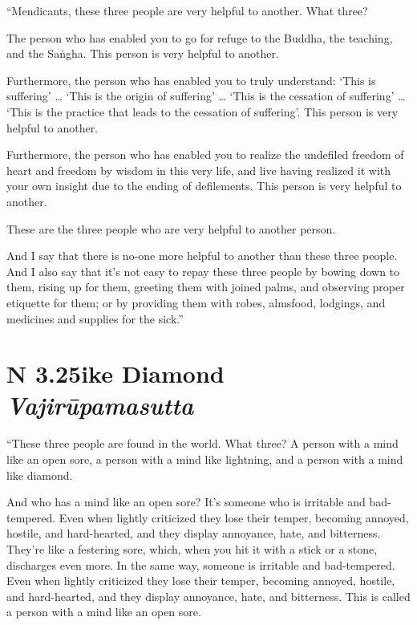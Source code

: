 \documentclass[12pt,openany]{book}%
\newcommand*{\suttatitleacronym}[1]{\smaller[2]{#1}\vspace*{.3em}}
\newcommand*{\suttatitletranslation}[1]{\linebreak{#1}}
\newcommand*{\suttatitleroot}[1]{\linebreak\smaller[2]\itshape{#1}}
\newcommand*{\tocacronym}[1]{\hspace*{-3.3em}{#1}\quad}
\newcommand*{\toctranslation}[1]{#1}
\newcommand*{\tocroot}[1]{(\textit{#1})}
\begin{document}
“Mendicants, these three people are very helpful to another. What three? 

The person who has enabled you to go for refuge to the Buddha, the teaching, and the \textsanskrit{Saṅgha}. This person is very helpful to another. 

Furthermore, the person who has enabled you to truly understand: ‘This is suffering’ … ‘This is the origin of suffering’ … ‘This is the cessation of suffering’ … ‘This is the practice that leads to the cessation of suffering’. This person is very helpful to another. 

Furthermore, the person who has enabled you to realize the undefiled freedom of heart and freedom by wisdom in this very life, and live having realized it with your own insight due to the ending of defilements. This person is very helpful to another. 

These are the three people who are very helpful to another person. 

And I say that there is no-one more helpful to another than these three people. And I also say that it’s not easy to repay these three people by bowing down to them, rising up for them, greeting them with joined palms, and observing proper etiquette for them; or by providing them with robes, almsfood, lodgings, and medicines and supplies for the sick.” 

%
\section*{{\suttatitleacronym AN 3.25}{\suttatitletranslation Like Diamond }{\suttatitleroot Vajirūpamasutta}}
\addcontentsline{toc}{section}{\tocacronym{AN 3.25} \toctranslation{Like Diamond } \tocroot{Vajirūpamasutta}}

“These three people are found in the world. What three? A person with a mind like an open sore, a person with a mind like lightning, and a person with a mind like diamond. 

And who has a mind like an open sore? It’s someone who is irritable and bad-tempered. Even when lightly criticized they lose their temper, becoming annoyed, hostile, and hard-hearted, and they display annoyance, hate, and bitterness. They’re like a festering sore, which, when you hit it with a stick or a stone, discharges even more. In the same way, someone is irritable and bad-tempered. Even when lightly criticized they lose their temper, becoming annoyed, hostile, and hard-hearted, and they display annoyance, hate, and bitterness. This is called a person with a mind like an open sore. 
\end{document}
